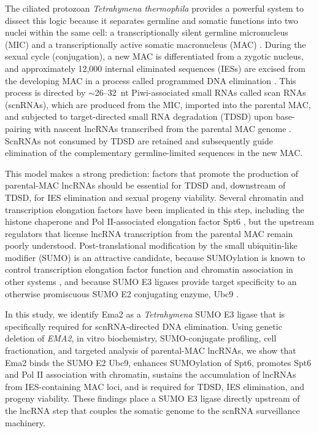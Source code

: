 \documentclass[11pt,a4paper]{article}
\begin{document}
The ciliated protozoan \textit{Tetrahymena thermophila} provides a powerful system to dissect this logic because it separates germline and somatic functions into two nuclei within the same cell: a transcriptionally silent germline micronucleus (MIC) and a transcriptionally active somatic macronucleus (MAC) \citep{Karrer2012}. During the sexual cycle (conjugation), a new MAC is differentiated from a zygotic nucleus, and approximately 12{,}000 internal eliminated sequences (IESs) are excised from the developing MAC in a process called programmed DNA elimination \citep{Chalker2013}. This process is directed by $\sim$26--32~nt Piwi-associated small RNAs called scan RNAs (scnRNAs), which are produced from the MIC, imported into the parental MAC, and subjected to target-directed small RNA degradation (TDSD) upon base-pairing with nascent lncRNAs transcribed from the parental MAC genome \citep{Mochizuki2002,Aronica2008}. ScnRNAs not consumed by TDSD are retained and subsequently guide elimination of the complementary germline-limited sequences in the new MAC.

This model makes a strong prediction: factors that promote the production of parental-MAC lncRNAs should be essential for TDSD and, downstream of TDSD, for IES elimination and sexual progeny viability. Several chromatin and transcription elongation factors have been implicated in this step, including the histone chaperone and Pol II-associated elongation factor Spt6 \citep{Hartzog2013}, but the upstream regulators that license lncRNA transcription from the parental MAC remain poorly understood. Post-translational modification by the small ubiquitin-like modifier (SUMO) is an attractive candidate, because SUMOylation is known to control transcription elongation factor function and chromatin association in other systems \citep{Hendriks2016,Geiss2007}, and because SUMO E3 ligases provide target specificity to an otherwise promiscuous SUMO E2 conjugating enzyme, Ubc9 \citep{Gareau2010}.

In this study, we identify Ema2 as a \textit{Tetrahymena} SUMO E3 ligase that is specifically required for scnRNA-directed DNA elimination. Using genetic deletion of \textit{EMA2}, in vitro biochemistry, SUMO-conjugate profiling, cell fractionation, and targeted analysis of parental-MAC lncRNAs, we show that Ema2 binds the SUMO E2 Ubc9, enhances SUMOylation of Spt6, promotes Spt6 and Pol II association with chromatin, sustains the accumulation of lncRNAs from IES-containing MAC loci, and is required for TDSD, IES elimination, and progeny viability. These findings place a SUMO E3 ligase directly upstream of the lncRNA step that couples the somatic genome to the scnRNA surveillance machinery.
\end{document}
